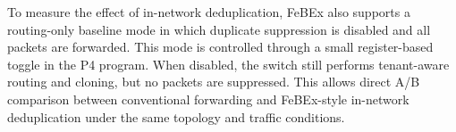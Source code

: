 To measure the effect of in-network deduplication, FeBEx also supports a routing-only baseline mode in which duplicate suppression is disabled and all packets are forwarded. This mode is controlled through a small register-based toggle in the P4 program. When disabled, the switch still performs tenant-aware routing and cloning, but no packets are suppressed. This allows direct A/B comparison between conventional forwarding and FeBEx-style in-network deduplication under the same topology and traffic conditions.






